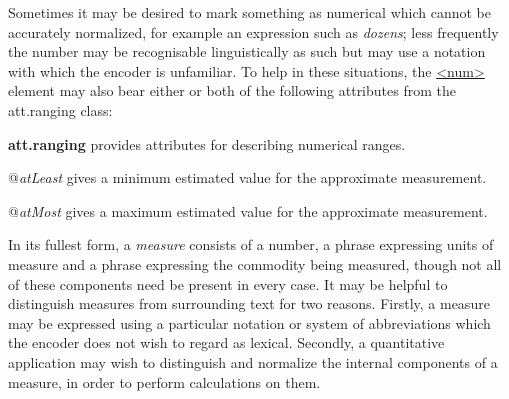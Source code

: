Sometimes it may be desired to mark something as numerical which cannot be accurately normalized, for example an expression such as \textit{dozens}; less frequently the number may be recognisable linguistically as such but may use a notation with which the encoder is unfamiliar. To help in these situations, the \hyperref[TEI.num]{<num>} element may also bear either or both of the following attributes from the \textsf{att.ranging} class: 
\begin{sansreflist}
  
\item [\textbf{att.ranging}] provides attributes for describing numerical ranges.\hfil\\[-10pt]\begin{sansreflist}
    \item[@{\itshape atLeast}]
  gives a minimum estimated value for the approximate measurement.
    \item[@{\itshape atMost}]
  gives a maximum estimated value for the approximate measurement.
\end{sansreflist}  
\end{sansreflist}
\par
In its fullest form, a \textit{measure} consists of a number, a phrase expressing units of measure and a phrase expressing the commodity being measured, though not all of these components need be present in every case. It may be helpful to distinguish measures from surrounding text for two reasons. Firstly, a measure may be expressed using a particular notation or system of abbreviations which the encoder does not wish to regard as lexical. Secondly, a quantitative application may wish to distinguish and normalize the internal components of a measure, in order to perform calculations on them.\par
